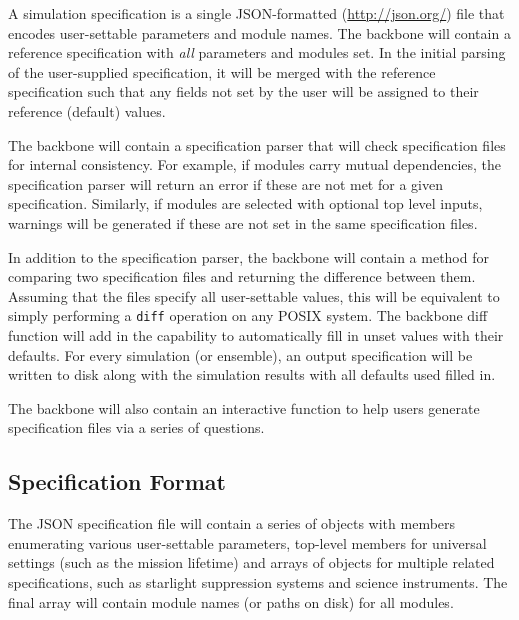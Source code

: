 \documentclass[cleanfoot]{asme2ej}
\begin{document}
A simulation specification is a single JSON-formatted (\url{http://json.org/}) file that encodes user-settable parameters and module names.  The backbone will contain a reference specification with \emph{all} parameters and modules set.  In the initial parsing of the user-supplied specification, it will be merged with the reference specification such that any fields not set by the user will be assigned to their reference (default) values.   

The backbone will contain a specification parser that will check specification files for internal consistency.  For example, if modules carry mutual dependencies, the specification parser will return an error if these are not met for a given specification.  Similarly, if modules are selected with optional top level inputs, warnings will be generated if these are not set in the same specification files.

In addition to the specification parser, the backbone will contain a method for comparing two specification files and returning the difference between them.  Assuming that the files specify all user-settable values, this will be equivalent to simply performing a \verb+diff+ operation on any POSIX system.  The backbone diff function will add in the capability to automatically fill in unset values with their defaults.  For every simulation (or ensemble), an output specification will be written to disk along with the simulation results with all defaults used filled in.

The backbone will also contain an interactive function to help users generate specification files via a series of questions.

\subsection{Specification Format}
The JSON specification file will contain a series of objects with members enumerating various user-settable parameters, top-level members for universal settings (such as the mission lifetime) and arrays of objects for multiple related specifications, such as starlight suppression systems and science instruments.  The final array will contain module names (or paths on disk) for all modules.
\end{document}

